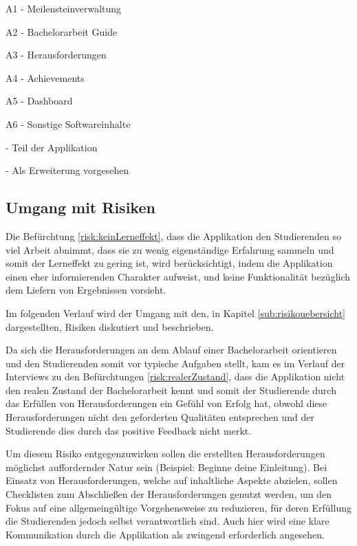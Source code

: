 \documentclass[bibliography=totoc,listof=totoc,BCOR=5mm,DIV=12,oneside]{scrbook}
\begin{document}
\begin{tablenotes}
\item  A1 - Meilensteinverwaltung
\item  A2 - Bachelorarbeit Guide
\item  A3 - Herausforderungen
\item  A4 - Achievements
\item  A5 - Dashboard 
\item  A6 - Sonstige Softwareinhalte
\item {} - Teil der Applikation
\item {} - Als Erweiterung vorgesehen
\end{tablenotes} 
\label{tab:abdeckungProduktfunktionen}

\newpage
\subsection{Umgang mit Risiken}

\par \medskip Die Befürchtung \ref{risk:keinLerneffekt}, dass die Applikation den Studierenden so viel Arbeit abnimmt, dass sie zu wenig eigenständige Erfahrung sammeln und somit der Lerneffekt zu gering ist, wird berücksichtigt, indem die Applikation einen eher informierenden Charakter aufweist, und keine Funktionalität bezüglich dem Liefern von Ergebnissen vorsieht.

\par Im folgenden Verlauf wird der Umgang mit den, in Kapitel \ref{sub:risikouebersicht} dargestellten, Risiken diskutiert und beschrieben.
\par \medskip Da sich die Herausforderungen an dem Ablauf einer Bachelorarbeit orientieren und den Studierenden somit vor typische Aufgaben stellt, kam es im Verlauf der Interviews zu den Befürchtungen \ref{risk:realerZustand}, dass die Applikation nicht den realen Zustand der Bachelorarbeit kennt und somit der Studierende durch das Erfüllen von Herausforderungen ein Gefühl von Erfolg hat, obwohl diese Herausforderungen nicht den geforderten Qualitäten entsprechen und der Studierende dies durch das positive Feedback nicht merkt.
\par Um diesem Risiko entgegenzuwirken sollen die erstellten Herausforderungen möglichst auffordernder Natur sein (Beispiel: \grqq Beginne deine Einleitung\grqq). Bei Einsatz von Herausforderungen, welche auf inhaltliche Aspekte abzielen, sollen Checklisten zum Abschließen der Herausforderungen genutzt werden, um den Fokus auf eine allgemeingültige Vorgehensweise zu reduzieren, für deren Erfüllung die Studierenden jedoch selbst verantwortlich sind. Auch hier wird eine klare Kommunikation durch die Applikation als zwingend erforderlich angesehen.
\end{document}
